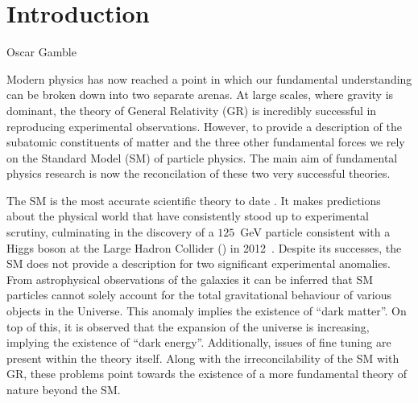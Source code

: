 \chapter{Introduction}
\label{chap:introduction}



%
{Oscar Gamble}


Modern physics has now reached a point in which our fundamental
understanding can be broken down into two separate arenas. At large
scales, where gravity is dominant, the theory of General Relativity
(GR) is incredibly successful in reproducing experimental
observations.  However, to provide a description of the subatomic
constituents of matter and the three other fundamental forces we rely
on the Standard Model (SM) of particle physics. The main aim of
fundamental physics research is now the reconcilation of these two
very successful theories.

The SM is the most accurate scientific theory to date
\cite{Salam1964}\cite{Glashow1961}\cite{Weinberg1967}. It makes
predictions about the physical world that have consistently stood up
to experimental scrutiny, culminating in the discovery of a
$125$~GeV particle consistent with a Higgs boson at the Large Hadron
Collider (\LHC) in 2012~\cite{ATLASHiggs2012}\cite{CMS2012HiggsPaper}.
Despite its successes, the SM does not provide a description for two
significant experimental anomalies. From astrophysical observations of the
galaxies it can be inferred that SM
particles cannot solely account for the total gravitational behaviour
of various objects in the Universe. This anomaly implies the existence
of ``dark matter''. On top of this, it is observed that the expansion
of the universe is increasing, implying the existence of 
``dark energy''. Additionally, issues of fine tuning are present
within the theory itself. Along with the irreconcilability of the SM
with GR, these problems point towards the existence of a more
fundamental theory of nature beyond the SM.

